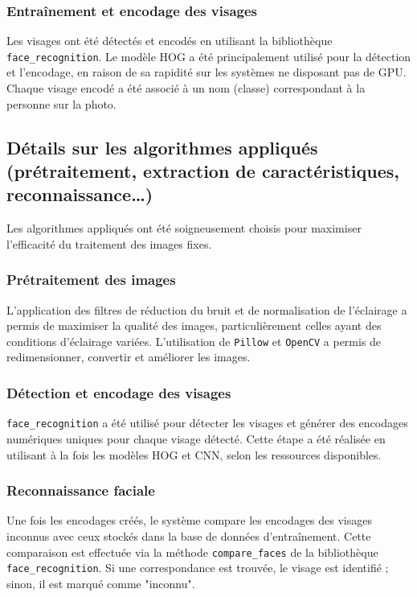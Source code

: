 \documentclass[a4paper,12pt]{report}
\begin{document}
\subsubsection{Entraînement et encodage des visages}
Les visages ont été détectés et encodés en utilisant la bibliothèque \texttt{face\_recognition}. Le modèle HOG a été principalement utilisé pour la détection et l’encodage, en raison de sa rapidité sur les systèmes ne disposant pas de GPU. Chaque visage encodé a été associé à un nom (classe) correspondant à la personne sur la photo.

\subsection{Détails sur les algorithmes appliqués (prétraitement, extraction de caractéristiques, reconnaissance…)}
Les algorithmes appliqués ont été soigneusement choisis pour maximiser l'efficacité du traitement des images fixes.
\subsubsection{Prétraitement des images}
L'application des filtres de réduction du bruit et de normalisation de l'éclairage a permis de maximiser la qualité des images, particulièrement celles ayant des conditions d'éclairage variées. L'utilisation de \texttt{Pillow} et \texttt{OpenCV} a permis de redimensionner, convertir et améliorer les images.

\subsubsection{Détection et encodage des visages}
\texttt{face\_recognition} a été utilisé pour détecter les visages et générer des encodages numériques uniques pour chaque visage détecté. Cette étape a été réalisée en utilisant à la fois les modèles HOG et CNN, selon les ressources disponibles.

\subsubsection{Reconnaissance faciale}
Une fois les encodages créés, le système compare les encodages des visages inconnus avec ceux stockés dans la base de données d'entraînement. Cette comparaison est effectuée via la méthode \texttt{compare\_faces} de la bibliothèque \texttt{face\_recognition}. Si une correspondance est trouvée, le visage est identifié ; sinon, il est marqué comme "inconnu".
\end{document}
